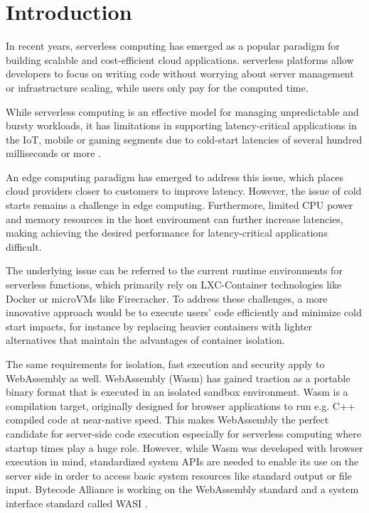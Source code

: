 \chapter{Introduction}
\label{chap:intro}

In recent years, \gls{serverless} computing has emerged as a popular paradigm for building scalable and cost-efficient cloud applications. \Gls{serverless} platforms allow developers to focus on writing code without worrying about server management or infrastructure scaling, while users only pay for the computed time.

While \gls{serverless} computing is an effective model for managing unpredictable and bursty
workloads, it has limitations in supporting latency-critical applications in the IoT, mobile or gaming segments due to cold-start latencies of several hundred milliseconds or more \cite{gackstatter_2022_pushing}. 

An \gls{edge computing} paradigm has emerged to address this issue, which places cloud providers closer to customers to improve latency. However, the issue of cold starts remains a challenge in edge computing. Furthermore, limited CPU power and memory resources in the host environment can further increase latencies, making achieving the desired performance for latency-critical applications difficult.

The underlying issue can be referred to the current runtime environments for \gls{serverless} functions, which primarily rely on \Gls{LXC-Container} technologies like Docker or microVMs like Firecracker. To address these challenges, a more innovative approach would be to execute users' code efficiently and minimize cold start impacts, for instance by replacing heavier containers with lighter alternatives that maintain the advantages of container isolation.

The same requirements for isolation, fast execution and security apply to \gls{WebAssembly} as well. \Gls{WebAssembly} (Wasm) has gained traction as a portable binary format that is executed in an isolated sandbox environment. Wasm is a compilation target, originally designed for browser applications to run e.g. C++ compiled code at near-native speed. This makes WebAssembly the perfect candidate for server-side code execution especially for serverless computing where startup times play a huge role. However, while Wasm was developed with browser execution in mind, standardized system APIs are needed to enable its use on the server side in order to access basic system resources like standard output or file input. Bytecode Alliance is working on the WebAssembly standard and a system interface standard called WASI \cite{webassembly_2023_webassemblywasi}.

